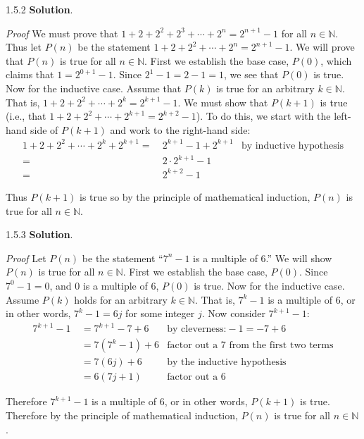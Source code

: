 \documentclass[11pt,]{book}
\makeatletter
\theoremstyle{ptxplainnotitle}
\theoremstyle{ptxplaintitle}
\renewcommand*{\proofname}{Proof}
\renewenvironment{proof}[1][\proofname]{\par
  \pushQED{\qed}%
  \normalfont \topsep6\p@\@plus6\p@\relax
  \trivlist
  \item\relax
    {\itshape
    #1\@addpunct{.}}\hspace\labelsep\ignorespaces
}{%
  \popQED\endtrivlist\@endpefalse
}
\theoremstyle{ptxdefinitionnotitle}
\theoremstyle{ptxdefinitiontitle}
\theoremstyle{ptxdefinitionnotitle}
\theoremstyle{ptxdefinitiontitle}
\theoremstyle{ptxdefinitionnotitle}
\theoremstyle{ptxdefinitiontitle}
\theoremstyle{ptxdefinitiontitlenonumber}
\theoremstyle{ptxdefinitiontitlenonumber}
\numberwithin{equation}{chapter}
\newcommand{\N}{\mathbb N}
\newcommand{\amp}{&}
\makeatother
\begin{document}
\begin{divisionexercise}{1.5.2}
\textbf{Solution}.\quad%
\begin{proof}\hypertarget{proof-5}{}
\hypertarget{p-589}{}%
We must prove that \(1 + 2 + 2^2 + 2^3 + \cdots +2^n = 2^{n+1} - 1\) for all \(n \in \N\). Thus let \(P(n)\) be the statement \(1 + 2 + 2^2 + \cdots + 2^n = 2^{n+1} - 1\). We will prove that \(P(n)\) is true for all \(n \in \N\). First we establish the base case, \(P(0)\), which claims that \(1 = 2^{0+1} -1\). Since \(2^1 - 1 = 2 - 1 = 1\), we see that \(P(0)\) is true. Now for the inductive case. Assume that \(P(k)\) is true for an arbitrary \(k \in \N\). That is, \(1 + 2 + 2^2 + \cdots + 2^k = 2^{k+1} - 1\). We must show that \(P(k+1)\) is true (i.e., that \(1 + 2 + 2^2 + \cdots + 2^{k+1} = 2^{k+2} - 1\)). To do this, we start with the left-hand side of \(P(k+1)\) and work to the right-hand side:%
\begin{align*}
1 + 2 + 2^2 + \cdots + 2^k + 2^{k+1} = \amp ~ 2^{k+1} - 1 + 2^{k+1} \amp \text{by inductive hypothesis}\\
= \amp ~2\cdot 2^{k+1} - 1 \amp\\
= \amp ~ 2^{k+2} - 1 \amp
\end{align*}
%
\par
\hypertarget{p-590}{}%
Thus \(P(k+1)\) is true so by the principle of mathematical induction, \(P(n)\) is true for all \(n \in \N\).%
\end{proof}
\end{divisionexercise}%
\begin{divisionexercise}{1.5.3}
\textbf{Solution}.\quad%
\begin{proof}\hypertarget{proof-6}{}
\hypertarget{p-592}{}%
Let \(P(n)\) be the statement ``\(7^n - 1\) is a multiple of 6.'' We will show \(P(n)\) is true for all \(n \in \N\). First we establish the base case, \(P(0)\). Since \(7^0 - 1 = 0\), and \(0\) is a multiple of 6, \(P(0)\) is true. Now for the inductive case. Assume \(P(k)\) holds for an arbitrary \(k \in \N\). That is, \(7^k - 1\) is a multiple of 6, or in other words, \(7^k - 1 = 6j\) for some integer \(j\). Now consider \(7^{k+1} - 1\):%
\begin{align*}
7^{k+1} - 1 ~ \amp = 7^{k+1} - 7 + 6 \amp \text{by cleverness:} -1 = -7 + 6\\
\amp = 7(7^k - 1) + 6 \amp \text{factor out a 7 from the first two terms}\\
\amp = 7(6j) + 6 \amp \text{by the inductive hypothesis}\\
\amp = 6(7j + 1) \amp \text{factor out a 6}
\end{align*}
%
\par
\hypertarget{p-593}{}%
Therefore \(7^{k+1} - 1\) is a multiple of 6, or in other words, \(P(k+1)\) is true. Therefore by the principle of mathematical induction, \(P(n)\) is true for all \(n \in \N\).%
\end{proof}
\end{divisionexercise}%
\end{document}

